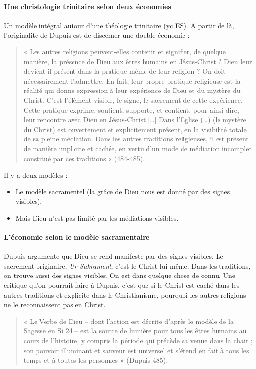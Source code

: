 \paragraph{Une christologie trinitaire selon deux économies}
Un modèle intégral autour d’une théologie trinitaire (yc ES). A partir de là, l’originalité de Dupuis est de discerner une double économie : 
\begin{quote}
    « Les autres religions peuvent-elles contenir et signifier, de quelque manière, la présence de Dieu aux êtres humains en Jésus-Christ ? Dieu leur devient-il présent dans la pratique même de leur religion ? On doit nécessairement l’admettre. En fait, leur propre pratique religieuse est la réalité qui donne expression à leur expérience de Dieu et du mystère du Christ. C’est l’élément visible, le signe, le sacrement de cette expérience. Cette pratique exprime, soutient, supporte, et contient, pour ainsi dire, leur rencontre avec Dieu en Jésus-Christ […] Dans l’Église (…) (le mystère du Christ) est ouvertement et explicitement présent, en la visibilité totale de sa pleine médiation. Dans les autres traditions religieuses, il est présent de manière implicite et cachée, en vertu d’un mode de médiation incomplet constitué par ces traditions » (484-485). 
\end{quote}


Il y a deux modèles : 
\begin{itemize}
    \item	Le modèle sacramentel (la grâce de Dieu nous est donné par des signes visibles). 
\item	Mais Dieu n’est pas limité par les médiations visibles.
\end{itemize}

\paragraph{L’économie selon le modèle sacramentaire}  Dupuis argumente que Dieu se rend manifeste par des signes visibles. Le sacrement originaire, \textit{Ur-Sakrament}, c’est le Christ lui-même. Dans les traditions, on trouve aussi des signes visibles. On est dans quelque chose de connu.  
Une critique qu’on pourrait faire à Dupuis, c’est que si le Christ est caché dans les autres traditions et explicite dans le Christianisme, pourquoi les autres religions ne le reconnaissent pas en Christ.

\begin{quote}
    « Le Verbe de Dieu – dont l’action est décrite d’après le modèle de la Sagesse en Si 24 – est la source de lumière pour tous les êtres humains au cours de l’histoire, y compris la période qui précède sa venue dans la chair ; son pouvoir illuminant et sauveur est universel et s’étend en fait à tous les temps et à toutes les personnes » (Dupuis 485).
\end{quote}




